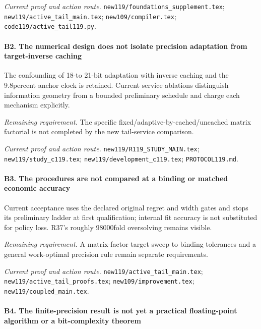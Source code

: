 \par\emph{Current proof and action route.} \nolinkurl{new119/foundations_supplement.tex}; \nolinkurl{new119/active_tail_main.tex}; \nolinkurl{new109/compiler.tex}; \nolinkurl{code119/active_tail119.py}.

\paragraph{B2. The numerical design does not isolate precision adaptation from target-inverse caching}

The confounding of 18-to 21-bit adaptation with inverse caching and the 9.8percent anchor clock is retained. Current service ablations distinguish information geometry from a bounded preliminary schedule and charge each mechanism explicitly.

\par\emph{Remaining requirement.} The specific fixed/\allowbreak{}adaptive-by-cached/\allowbreak{}uncached matrix factorial is not completed by the new tail-service comparison.

\par\emph{Current proof and action route.} \nolinkurl{new119/R119_STUDY_MAIN.tex}; \nolinkurl{new119/study_c119.tex}; \nolinkurl{new119/development_c119.tex}; \nolinkurl{PROTOCOL119.md}.

\paragraph{B3. The procedures are not compared at a binding or matched economic accuracy}

Current acceptance uses the declared original regret and width gates and stops its preliminary ladder at first qualification; internal fit accuracy is not substituted for policy loss. R37's roughly 98000fold oversolving remains visible.

\par\emph{Remaining requirement.} A matrix-factor target sweep to binding tolerances and a general work-optimal precision rule remain separate requirements.

\par\emph{Current proof and action route.} \nolinkurl{new119/active_tail_main.tex}; \nolinkurl{new119/active_tail_proofs.tex}; \nolinkurl{new109/improvement.tex}; \nolinkurl{new119/coupled_main.tex}.

\paragraph{B4. The finite-precision result is not yet a practical floating-point algorithm or a bit-complexity theorem}

